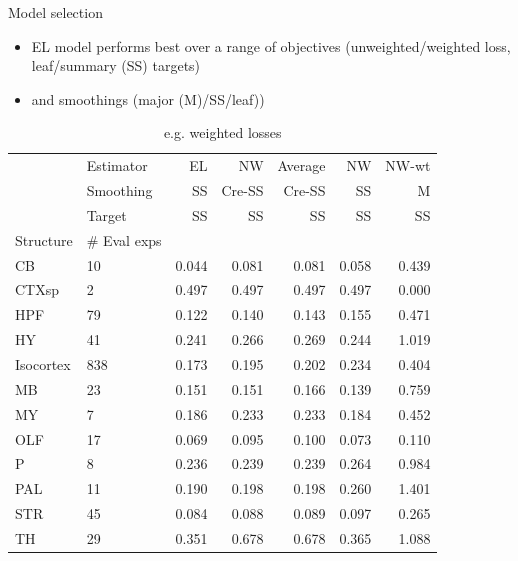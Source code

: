 \documentclass{beamer}
\begin{document}
\begin{frame}{Model selection}
\begin{itemize}
    \item EL model performs best over a range of objectives (unweighted/weighted loss, leaf/summary (SS) targets) 
    \item and smoothings (major (M)/SS/leaf))
\end{itemize}
\begin{table}
\begin{adjustbox}{width=.7\columnwidth,center}

\begin{tabular}{ll|rrrrr}
\toprule
   & Estimator &     EL &     NW & Average &     NW &  NW-wt \\
   & Smoothing &     SS & Cre-SS &  Cre-SS &     SS &      M \\
   & Target &     SS &     SS &      SS &     SS &     SS \\
Structure & \# Eval exps &        &        &         &        &        \\
\midrule
\hline
CB & 10 &  0.044 &  0.081 &   0.081 &  0.058 &  0.439 \\
CTXsp & 2 &  0.497 &  0.497 &   0.497 &  0.497 &  0.000 \\
HPF & 79 &  0.122 &  0.140 &   0.143 &  0.155 &  0.471 \\
HY & 41 &  0.241 &  0.266 &   0.269 &  0.244 &  1.019 \\
Isocortex & 838 &  0.173 &  0.195 &   0.202 &  0.234 &  0.404 \\
MB & 23 &  0.151 &  0.151 &   0.166 &  0.139 &  0.759 \\
MY & 7 &  0.186 &  0.233 &   0.233 &  0.184 &  0.452 \\
OLF & 17 &  0.069 &  0.095 &   0.100 &  0.073 &  0.110 \\
P & 8 &  0.236 &  0.239 &   0.239 &  0.264 &  0.984 \\
PAL & 11 &  0.190 &  0.198 &   0.198 &  0.260 &  1.401 \\
STR & 45 &  0.084 &  0.088 &   0.089 &  0.097 &  0.265 \\
TH & 29 &  0.351 &  0.678 &   0.678 &  0.365 &  1.088 \\
\bottomrule
\end{tabular}
\end{adjustbox}
\caption{e.g. weighted losses }
\end{table}

\end{frame}
\end{document}
